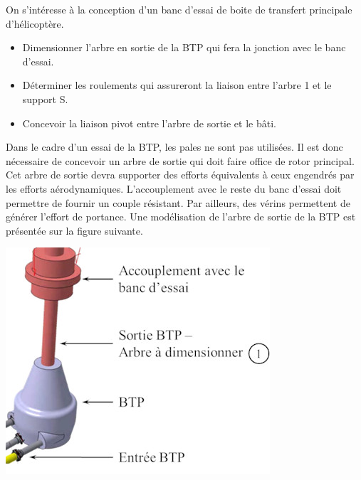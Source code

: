 \documentclass[10pt,fleqn]{article} %
\begin{document}

\vspace{4.5cm}
\pagestyle{fancy}
\thispagestyle{plain}


\def\columnseprulecolor{\color{ocre}}
\setlength{\columnseprule}{0.4pt} 

\begin{multicols}{2}
On s'intéresse à la conception d'un banc d'essai de boite de transfert principale d'hélicoptère. 



\begin{obj}
\begin{itemize}
\item Dimensionner l’arbre en sortie de la BTP qui fera la jonction avec le banc d’essai.
\item Déterminer les roulements qui assureront la liaison entre l’arbre 1 et le support S.
\item Concevoir la liaison pivot entre l’arbre de sortie et le bâti.
\end{itemize}
\end{obj}

Dans le cadre d’un essai de la BTP, les pales ne sont pas utilisées. Il est donc nécessaire de concevoir un arbre de sortie qui doit faire office de rotor principal. Cet arbre de sortie devra supporter des efforts équivalents à ceux engendrés par les efforts aérodynamiques. L’accouplement avec le reste du banc d’essai doit permettre de fournir un couple résistant. Par ailleurs, des vérins permettent de générer l’effort de portance. Une modélisation de l’arbre de sortie de la BTP est présentée sur la figure suivante.

 
\begin{center}
\includegraphics[width=.75\linewidth]{images/fig_02}


\end{center}
\end{multicols}
\end{document}
